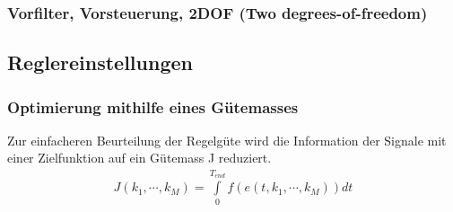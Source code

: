 \subsubsection{Vorfilter, Vorsteuerung, 2DOF (Two degrees-of-freedom) }


\subsection{Reglereinstellungen }


\subsubsection{Optimierung mithilfe eines Gütemasses}

Zur einfacheren Beurteilung der Regelgüte wird die Information der Signale mit einer Zielfunktion auf ein
Gütemass J reduziert.
\begin{eqnarray}
J(k_1,\cdots,k_M)=\int\limits_{0}^{T_{end}}f(e(t,k_1,\cdots,k_M))dt\\
\end{eqnarray}

